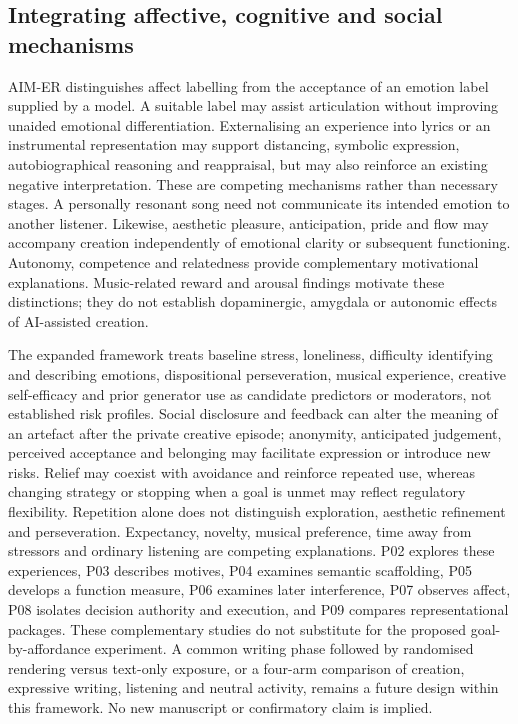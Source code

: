 \documentclass[11pt,a4paper]{article}
\begin{document}
\subsection{Integrating affective, cognitive and social mechanisms}
AIM-ER distinguishes affect labelling from the acceptance of an emotion label supplied by a model. A suitable label may assist articulation without improving unaided emotional differentiation. Externalising an experience into lyrics or an instrumental representation may support distancing, symbolic expression, autobiographical reasoning and reappraisal, but may also reinforce an existing negative interpretation. These are competing mechanisms rather than necessary stages. A personally resonant song need not communicate its intended emotion to another listener. Likewise, aesthetic pleasure, anticipation, pride and flow may accompany creation independently of emotional clarity or subsequent functioning. Autonomy, competence and relatedness provide complementary motivational explanations. Music-related reward and arousal findings motivate these distinctions; they do not establish dopaminergic, amygdala or autonomic effects of AI-assisted creation.

The expanded framework treats baseline stress, loneliness, difficulty identifying and describing emotions, dispositional perseveration, musical experience, creative self-efficacy and prior generator use as candidate predictors or moderators, not established risk profiles. Social disclosure and feedback can alter the meaning of an artefact after the private creative episode; anonymity, anticipated judgement, perceived acceptance and belonging may facilitate expression or introduce new risks. Relief may coexist with avoidance and reinforce repeated use, whereas changing strategy or stopping when a goal is unmet may reflect regulatory flexibility. Repetition alone does not distinguish exploration, aesthetic refinement and perseveration. Expectancy, novelty, musical preference, time away from stressors and ordinary listening are competing explanations. P02 explores these experiences, P03 describes motives, P04 examines semantic scaffolding, P05 develops a function measure, P06 examines later interference, P07 observes affect, P08 isolates decision authority and execution, and P09 compares representational packages. These complementary studies do not substitute for the proposed goal-by-affordance experiment. A common writing phase followed by randomised rendering versus text-only exposure, or a four-arm comparison of creation, expressive writing, listening and neutral activity, remains a future design within this framework. No new manuscript or confirmatory claim is implied.
\end{document}
